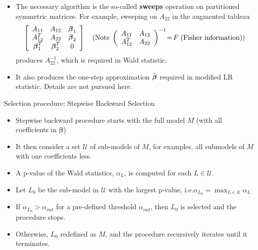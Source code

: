 \documentclass{beamer}
\begin{document}
\begin{frame}{}
\begin{itemize}
\item
The necessary algorithm is the so-called \textbf{sweeps} operation on partitioned
symmetric matrices. For example, sweeping on $A_{22}$ in the augmented tableau 
$$\left[\begin{array}{ccc}A_{11} & A_{12} & \mbox{\boldmath $\beta$}_1 \\
A_{12}^T & A_{22} & \mbox{\boldmath $\beta$}_2 \\
\mbox{\boldmath $\beta$}_1^T & \mbox{\boldmath $\beta$}_2^T & 0 \end{array}\right]
\quad\mbox{(Note} \; \left(\begin{array}{cc}A_{11} & A_{12} \\
A_{12}^T & A_{22}\end{array}\right)^{-1}\!=\!F\;\mbox{(Fisher information))}$$
produces $A_{22}^{-1}$, which is required in Wald statistic.
\item
It also produces the one-step approximation $\bar{\mbox{\boldmath $\beta$}}$ required in
modified LR statistic. Details are not pursued here.
\end{itemize}
\end{frame}

\begin{frame}{Selection procedure: Stepwise Backward Selection}


\begin{itemize}
\item Stepwise backward procedure starts with the full model $M$ (with all coefficients in $\boldsymbol \beta$)


\item It then consider a set $\mathcal{U}$ of sub-models of $M$, for examples, all submodels of $M$ with one coefficients less.

\item A p-value of the Wald statistics, $\alpha_L$, is computed for each $L \in \mathcal{U}$.


\item Let $L_0$ be the sub-model in $\mathcal{U}$ with the largest p-value, i.e.$\alpha_{L_0} = \max_{L\in \mathcal{U}} \alpha_L$

\item If $\alpha_{L_0} > \alpha_{out}$ for a pre-defined threshold  $\alpha_{out}$, then $L_0$ is selected and the procedure stops.

\item Otherwise, $L_0$ redefined as $M$, and the procedure recursively iterates until it terminates.

\end{itemize}


\end{frame}
\end{document}
